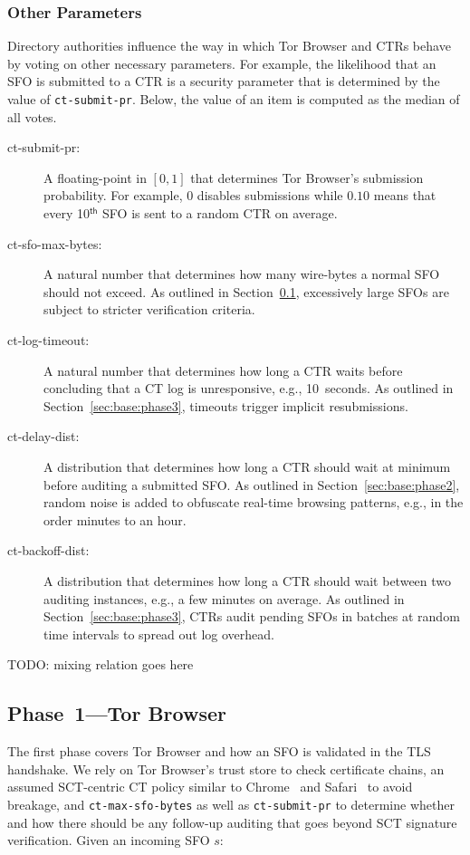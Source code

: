 \subsubsection{Other Parameters} \label{sec:base:consensus:params}
Directory authorities influence the way in which Tor Browser and CTRs behave by
voting on other necessary parameters.  For example, the likelihood that
an SFO is submitted to a CTR is a security parameter that is determined by the
value of \texttt{ct-submit-pr}.  Below, the value of an item is computed as the
median of all votes.
\begin{description}
	\item[ct-submit-pr:] A floating-point in $[0,1]$ that determines Tor
		Browser's submission probability.  For example, $0$ disables submissions
		while $0.10$ means that every 10$^{\mathsf{th}}$ SFO is sent to a
		random CTR on average.
	\item[ct-sfo-max-bytes:] A natural number that determines how many
		wire-bytes a normal SFO should not exceed.  As outlined in
		Section~\ref{sec:base:phase1}, excessively large SFOs are subject
		to stricter verification criteria.
	\item[ct-log-timeout:] A natural number that determines how long a CTR
		waits before concluding that a CT log is unresponsive, e.g., 10~seconds.
		As outlined in Section~\ref{sec:base:phase3}, timeouts trigger implicit
		resubmissions.
	\item[ct-delay-dist:] A distribution that determines how long a CTR should
		wait at minimum before auditing a submitted SFO.  As outlined in
		Section~\ref{sec:base:phase2}, random noise is added to obfuscate
		real-time browsing patterns, e.g., in the order minutes to an hour.
	\item[ct-backoff-dist:]
		A distribution that determines how long a CTR should wait between two
		auditing instances, e.g., a few minutes on average.  As outlined in
		Section~\ref{sec:base:phase3}, CTRs audit pending SFOs in batches at
		random time intervals to spread out log overhead.
\end{description}

TODO: mixing relation goes here

\subsection{Phase~1---Tor Browser} \label{sec:base:phase1}
The first phase covers Tor Browser and how an SFO is validated in the TLS
handshake.  We rely on Tor Browser's trust store to check certificate chains, an
assumed SCT-centric CT policy similar to Chrome~\cite{chrome-policy} and
Safari~\cite{safari-policy} to avoid breakage, and \texttt{ct-max-sfo-bytes} as
well as \texttt{ct-submit-pr} to determine whether and how there should be any
follow-up auditing that goes beyond SCT signature verification.  Given an
incoming SFO $s$:

